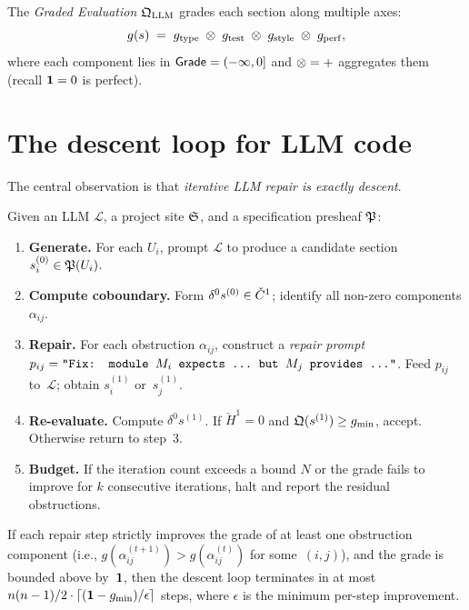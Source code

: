 The \emph{Graded Evaluation} $\mathfrak{Q}_{\mathrm{LLM}}$ grades each
section along multiple axes:
\begin{equation}
\label{eq:llm-grade}
  g(s) \;=\; g_{\mathrm{type}} \;\otimes\;
             g_{\mathrm{test}} \;\otimes\;
             g_{\mathrm{style}} \;\otimes\;
             g_{\mathrm{perf}},
\end{equation}
where each component lies in $\mathsf{Grade} = (-\infty, 0]$ and
$\otimes = +$ aggregates them (recall $\mathbf{1} = 0$ is perfect).

\section{The descent loop for LLM code}
\label{sec:llm-descent}

The central observation is that \emph{iterative LLM repair is exactly
descent}.

\begin{construction}
\label{con:llm-descent}
Given an LLM $\mathcal{L}$, a project site $\mathfrak{S}$, and a
specification presheaf $\mathfrak{P}$:
\begin{enumerate}
  \item \textbf{Generate.}\; For each $U_i$, prompt $\mathcal{L}$
        to produce a candidate section
        $s_i^{(0)} \in \mathfrak{P}(U_i)$.
  \item \textbf{Compute coboundary.}\; Form
        $\delta^0 s^{(0)} \in \check{C}^1$; identify all non-zero
        components $\alpha_{ij}$.
  \item \textbf{Repair.}\; For each obstruction $\alpha_{ij}$,
        construct a \emph{repair prompt}
        $p_{ij} = \texttt{``Fix: module } M_i \texttt{ expects \dots\ but }
        M_j \texttt{ provides \dots''}$.
        Feed $p_{ij}$ to~$\mathcal{L}$; obtain $s_i^{(1)}$
        or~$s_j^{(1)}$.
  \item \textbf{Re-evaluate.}\; Compute $\delta^0 s^{(1)}$.
        If $\check{H}^1 = 0$ and
        $\mathfrak{Q}(s^{(1)}) \geq g_{\min}$, accept.
        Otherwise return to step~3.
  \item \textbf{Budget.}\; If the iteration count exceeds a bound
        $N$ or the grade fails to improve for $k$ consecutive
        iterations, halt and report the residual obstructions.
\end{enumerate}
\end{construction}

\begin{proposition}
\label{prop:llm-descent-mono}
If each repair step strictly improves the grade of at least one
obstruction component (i.e., $g(\alpha_{ij}^{(t+1)}) >
g(\alpha_{ij}^{(t)})$ for some~$(i,j)$), and the grade is bounded
above by~$\mathbf{1}$, then the descent loop terminates in at most
$n(n-1)/2 \cdot \lceil (\mathbf{1} - g_{\min})/\epsilon \rceil$ steps,
where $\epsilon$ is the minimum per-step improvement.
\end{proposition}

